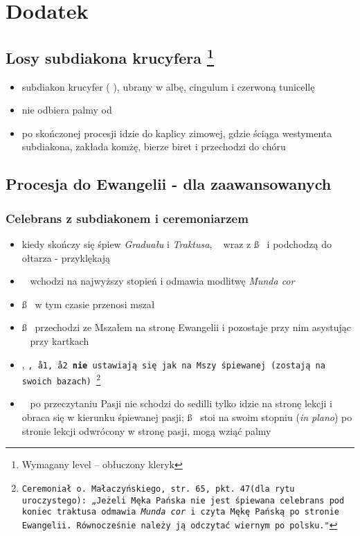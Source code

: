 \section{Dodatek}
\label{sec:dodatek_palm}

\subsection{Losy subdiakona krucyfera \protect \footnote{Wymagany level -- obłuczony kleryk}}
\begin{itemize}
      \item subdiakon krucyfer (  ), ubrany w albę, cingulum i czerwoną
            tunicellę
      \item nie odbiera palmy od \ii
      \item po skończonej procesji idzie do kaplicy zimowej, gdzie ściąga westymenta
            subdiakona, zakłada komżę, bierze biret i przechodzi do chóru
\end{itemize}

\subsection{Procesja do Ewangelii - dla zaawansowanych}

\subsubsection*{\textbf{Celebrans z subdiakonem i ceremoniarzem }}
\begin{itemize}
      \item kiedy skończy się śpiew \textit{Graduału} i \textit{Traktusa}, \ii~ wraz
            z \ss~ i  podchodzą do ołtarza - przyklękają
      \item \ii~ wchodzi na najwyższy stopień i odmawia modlitwę \textit{Munda cor}
      \item \ss~ w tym czasie przenosi mszał
      \item \ss~ przechodzi ze Mszałem na stronę Ewangelii i pozostaje przy nim
            asystując \ii~ przy kartkach
      \item {}, \tt, \aa1, \aa2 \textbf{nie} ustawiają się jak na Mszy
            śpiewanej (zostają na swoich bazach) \footnote{Ceremoniał o.
                  Małaczyńskiego, str. 65, pkt. 47(dla rytu uroczystego): „Jeżeli Męka
                  Pańska nie jest śpiewana celebrans pod koniec traktusa odmawia
                  \textit{Munda cor} i czyta Mękę Pańską po stronie Ewangelii.
                  Równocześnie należy ją odczytać wiernym  po polsku."}
      \item \ii~ po przeczytaniu Pasji nie schodzi do sedilli tylko idzie na
            stronę lekcji i obraca się w kierunku śpiewanej pasji; \ss~ stoi na
            swoim stopniu (\textit{in plano}) po stronie lekcji odwrócony w
            stronę pasji, mogą wziąć palmy
\end{itemize}

